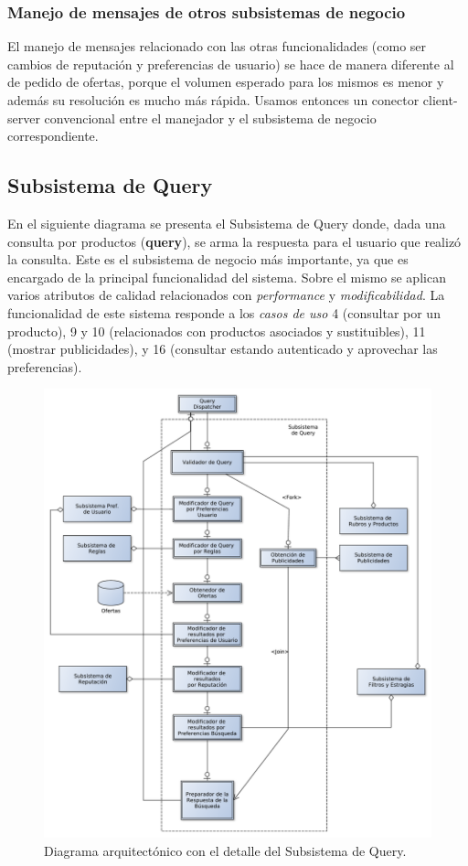 \subsubsection{Manejo de mensajes de otros subsistemas de negocio}

El manejo de mensajes relacionado con las otras funcionalidades (como ser cambios de reputaci\'on y preferencias de usuario) se hace de manera diferente al de pedido de ofertas, porque el volumen esperado para los mismos es menor y además su resoluci\'on es mucho más r\'apida. Usamos entonces un conector client-server convencional entre el \textsf{manejador} y el \textsf{subsistema de negocio} correspondiente.


\subsection{Subsistema de Query}

En el siguiente diagrama se presenta el \textsf{Subsistema de Query} donde, dada una consulta por productos (\textbf{query}), se arma la respuesta para el usuario que realizó la consulta. Este es el \textsf{subsistema de negocio} más importante, ya que es encargado de la principal funcionalidad del sistema. Sobre el mismo se aplican varios atributos de calidad relacionados con \emph{performance} y \emph{modificabilidad}. La funcionalidad de este sistema responde a los \emph{casos de uso} 4 (consultar por un producto), 9 y 10 (relacionados con productos asociados y sustituibles), 11 (mostrar publicidades), y 16 (consultar estando autenticado y aprovechar las preferencias).


\begin{figure}[H]
	\centering
	\includegraphics[width=\textwidth]{graficos/arch/subsistema_query.pdf}
	\caption{Diagrama arquitectónico con el detalle del \textsf{Subsistema de Query}.}
\end{figure}

